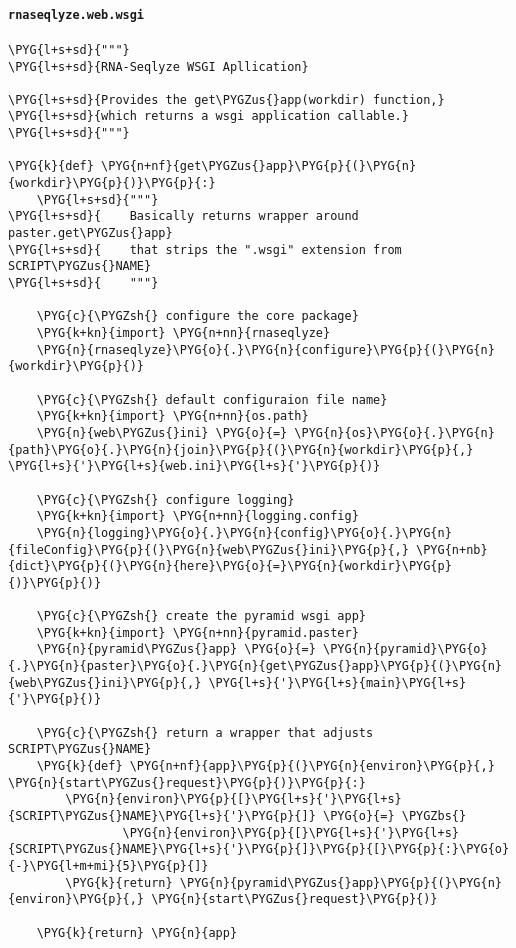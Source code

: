 \paragraph{\texttt{rnaseqlyze.web.wsgi}}
\label{index-pdf4:rnaseqlyze-web-wsgi}
\begin{Verbatim}[commandchars=\\\{\}]
\PYG{l+s+sd}{"""}
\PYG{l+s+sd}{RNA-Seqlyze WSGI Apllication}

\PYG{l+s+sd}{Provides the get\PYGZus{}app(workdir) function,}
\PYG{l+s+sd}{which returns a wsgi application callable.}
\PYG{l+s+sd}{"""}

\PYG{k}{def} \PYG{n+nf}{get\PYGZus{}app}\PYG{p}{(}\PYG{n}{workdir}\PYG{p}{)}\PYG{p}{:}
    \PYG{l+s+sd}{"""}
\PYG{l+s+sd}{    Basically returns wrapper around paster.get\PYGZus{}app}
\PYG{l+s+sd}{    that strips the ".wsgi" extension from SCRIPT\PYGZus{}NAME}
\PYG{l+s+sd}{    """}

    \PYG{c}{\PYGZsh{} configure the core package}
    \PYG{k+kn}{import} \PYG{n+nn}{rnaseqlyze}
    \PYG{n}{rnaseqlyze}\PYG{o}{.}\PYG{n}{configure}\PYG{p}{(}\PYG{n}{workdir}\PYG{p}{)}

    \PYG{c}{\PYGZsh{} default configuraion file name}
    \PYG{k+kn}{import} \PYG{n+nn}{os.path}
    \PYG{n}{web\PYGZus{}ini} \PYG{o}{=} \PYG{n}{os}\PYG{o}{.}\PYG{n}{path}\PYG{o}{.}\PYG{n}{join}\PYG{p}{(}\PYG{n}{workdir}\PYG{p}{,} \PYG{l+s}{'}\PYG{l+s}{web.ini}\PYG{l+s}{'}\PYG{p}{)}

    \PYG{c}{\PYGZsh{} configure logging}
    \PYG{k+kn}{import} \PYG{n+nn}{logging.config}
    \PYG{n}{logging}\PYG{o}{.}\PYG{n}{config}\PYG{o}{.}\PYG{n}{fileConfig}\PYG{p}{(}\PYG{n}{web\PYGZus{}ini}\PYG{p}{,} \PYG{n+nb}{dict}\PYG{p}{(}\PYG{n}{here}\PYG{o}{=}\PYG{n}{workdir}\PYG{p}{)}\PYG{p}{)}

    \PYG{c}{\PYGZsh{} create the pyramid wsgi app}
    \PYG{k+kn}{import} \PYG{n+nn}{pyramid.paster}
    \PYG{n}{pyramid\PYGZus{}app} \PYG{o}{=} \PYG{n}{pyramid}\PYG{o}{.}\PYG{n}{paster}\PYG{o}{.}\PYG{n}{get\PYGZus{}app}\PYG{p}{(}\PYG{n}{web\PYGZus{}ini}\PYG{p}{,} \PYG{l+s}{'}\PYG{l+s}{main}\PYG{l+s}{'}\PYG{p}{)}

    \PYG{c}{\PYGZsh{} return a wrapper that adjusts SCRIPT\PYGZus{}NAME}
    \PYG{k}{def} \PYG{n+nf}{app}\PYG{p}{(}\PYG{n}{environ}\PYG{p}{,} \PYG{n}{start\PYGZus{}request}\PYG{p}{)}\PYG{p}{:}
        \PYG{n}{environ}\PYG{p}{[}\PYG{l+s}{'}\PYG{l+s}{SCRIPT\PYGZus{}NAME}\PYG{l+s}{'}\PYG{p}{]} \PYG{o}{=} \PYGZbs{}
                \PYG{n}{environ}\PYG{p}{[}\PYG{l+s}{'}\PYG{l+s}{SCRIPT\PYGZus{}NAME}\PYG{l+s}{'}\PYG{p}{]}\PYG{p}{[}\PYG{p}{:}\PYG{o}{-}\PYG{l+m+mi}{5}\PYG{p}{]}
        \PYG{k}{return} \PYG{n}{pyramid\PYGZus{}app}\PYG{p}{(}\PYG{n}{environ}\PYG{p}{,} \PYG{n}{start\PYGZus{}request}\PYG{p}{)}

    \PYG{k}{return} \PYG{n}{app}
\end{Verbatim}


